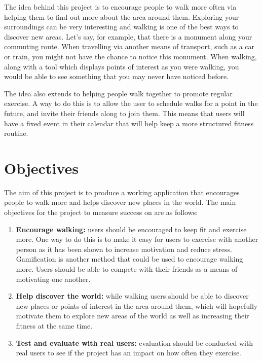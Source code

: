 The idea behind this project is to encourage people to walk more often via helping them to find out more about the area around them. Exploring your surroundings can be very interesting and walking is one of the best ways to discover new areas. Let's say, for example, that there is a monument along your commuting route. When travelling via another means of transport, such as a car or train, you might not have the chance to notice this monument. When walking, along with a tool which displays points of interest as you were walking, you would be able to see something that you may never have noticed before.

The idea also extends to helping people walk together to promote regular exercise. A way to do this is to allow the user to schedule walks for a point in the future, and invite their friends along to join them. This means that users will have a fixed event in their calendar that will help keep a more structured fitness routine.


\section{Objectives} \label{section:objectives}

The aim of this project is to produce a working application that encourages people to walk more and helps discover new places in the world. The main objectives for the project to measure success on are as follows:

\begin{enumerate}[label=\textbf{Obj \arabic*}]
  \item \textbf{Encourage walking:} users should be encouraged to keep fit and exercise more.  One way to do this is to make it easy for users to exercise with another person as it has been shown to increase motivation and reduce stress. Gamification is another method that could be used to encourage walking more. Users should be able to compete with their friends as a means of motivating one another.
  \item \textbf{Help discover the world:} while walking users should be able to discover new places or points of interest in the area around them, which will hopefully motivate them to explore new areas of the world as well as increasing their fitness at the same time.
  \item \textbf{Test and evaluate with real users:} evaluation should be conducted with real users to see if the project has an impact on how often they exercise.
\end{enumerate}







